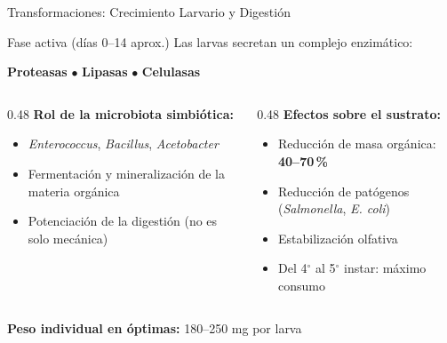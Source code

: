 \documentclass[aspectratio=169, 11pt]{beamer}
\begin{document}
\begin{frame}{Transformaciones: Crecimiento Larvario y Digestión}
\begin{block}{Fase activa (días 0--14 aprox.)}
Las larvas secretan un complejo enzimático:
\begin{center}
\textbf{Proteasas} \quad $\bullet$ \quad \textbf{Lipasas} \quad $\bullet$ \quad \textbf{Celulasas}
\end{center}
\end{block}
\vspace{0.2cm}
\begin{columns}[T]
\begin{column}{0.48\textwidth}
\textbf{Rol de la microbiota simbiótica:}
\begin{itemize}
    \item \textit{Enterococcus}, \textit{Bacillus}, \textit{Acetobacter}
    \item Fermentación y mineralización de la materia orgánica
    \item Potenciación de la digestión (no es solo mecánica)
\end{itemize}
\end{column}
\begin{column}{0.48\textwidth}
\textbf{Efectos sobre el sustrato:}
\begin{itemize}
    \item Reducción de masa orgánica: \textbf{40--70\,\%}
    \item Reducción de patógenos (\textit{Salmonella}, \textit{E. coli})
    \item Estabilización olfativa
    \item Del 4$^\circ$ al 5$^\circ$ instar: máximo consumo
\end{itemize}
\end{column}
\end{columns}
\vfill
\begin{center}
\textcolor{verdeOK}{\textbf{Peso individual en óptimas:}} 180--250 mg por larva
\end{center}
\end{frame}
\end{document}

